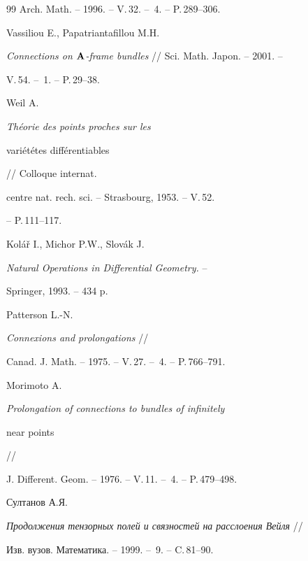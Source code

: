 \begin{thebibliography}{99}
Arch. Math. -- 1996. -- V.\,32. -- \No\,4. -- P.\,289--306.







Vassiliou E., Papatriantafillou M.H.


{\it Connections on ${\bold A}$-frame bundles} // Sci. Math. Japon. -- 2001. --


V.\,54. -- \No\,1. -- P.\,29--38.







Weil A. {\it Th\'eorie des points proches sur les


vari\'et\'etes diff\'erentiables} // Colloque internat.


centre nat. rech. sci. -- Strasbourg, 1953. -- V.\,52.


-- P.\,111--117.







Kol\'a\v r I., Michor P.W., Slov\'ak J.


{\it Natural Operations in Differential Geometry.} --


Springer, 1993. -- 434 p.







Patterson L.-N.


{\it Connexions and prolongations} //


Canad. J. Math. -- 1975. -- V.\,27. -- \No\,4. -- P.\,766--791.







Morimoto A.


{\it Prolongation of connections to bundles of infinitely


near points} //


J. Different. Geom. -- 1976. -- V.\,11. -- \No\,4. -- P.\,479--498.







Султанов А.Я.


{\it Продолжения тензорных полей и связностей на расслоения Вейля} //


Изв. вузов. Математика. -- 1999. -- \No\,9. -- C.\,81--90.






\end{thebibliography}
